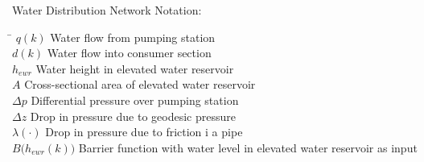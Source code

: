 \newpage

{\Large Water Distribution Network Notation:}
\begin{tabbing}
	\hspace{40mm} \= \kill
	$q(k) $ \> Water flow from pumping station \\ 
	$d(k) $ \> Water flow into consumer section \\ 
	$ h_{ewr} $ \> Water height in elevated water reservoir \\
	$ A $ \> Cross-sectional area of elevated water reservoir \\
	$ \Delta{p} $ \> Differential pressure over pumping station \\
	$ \Delta{z} $ \> Drop in pressure due to geodesic pressure \\
	$ \lambda(\cdot) $ \> Drop in pressure due to friction i a pipe \\
	$ B\bigg(h_{ewr}(k)\bigg) $ \> Barrier function with water level in elevated water reservoir as input \\
\end{tabbing}

